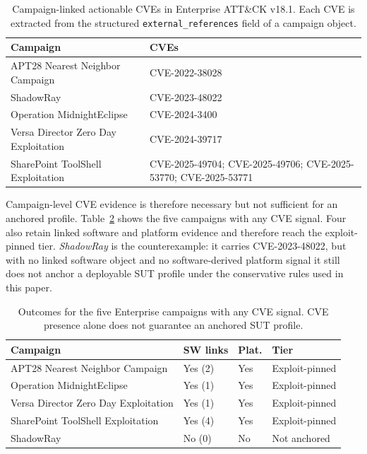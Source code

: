 \documentclass[sigconf]{acmart}
\begin{document}
\begin{table}[!htb]
\caption{Campaign-linked actionable CVEs in Enterprise ATT\&CK v18.1. Each CVE is extracted from the structured \texttt{external\_references} field of a campaign object.}\label{tab:campaign_linked_cves}
\centering\small
\begin{tabular}{>{\raggedright\arraybackslash}p{4.2cm} >{\raggedright\arraybackslash}p{3.0cm}}
\toprule
\textbf{Campaign} & \textbf{CVEs} \\
\midrule
APT28 Nearest Neighbor Campaign & CVE-2022-38028 \\
ShadowRay & CVE-2023-48022 \\
Operation MidnightEclipse & CVE-2024-3400 \\
Versa Director Zero Day Exploitation & CVE-2024-39717 \\
SharePoint ToolShell Exploitation & CVE-2025-49704; CVE-2025-49706; CVE-2025-53770; CVE-2025-53771 \\
\bottomrule
\end{tabular}
\end{table}

Campaign-level CVE evidence is therefore necessary but not sufficient for an anchored profile. Table~\ref{tab:cve_profile_outcomes} shows the five campaigns with any CVE signal. Four also retain linked software and platform evidence and therefore reach the exploit-pinned tier. \emph{ShadowRay} is the counterexample: it carries CVE-2023-48022, but with no linked software object and no software-derived platform signal it still does not anchor a deployable SUT profile under the conservative rules used in this paper.

\begin{table}[!htb]
\caption{Outcomes for the five Enterprise campaigns with any CVE signal. CVE presence alone does not guarantee an anchored SUT profile.}\label{tab:cve_profile_outcomes}
\centering\scriptsize
\begin{tabular}{@{}>{\raggedright\arraybackslash}p{2.55cm}>{\centering\arraybackslash}p{1.05cm}>{\centering\arraybackslash}p{0.95cm}>{\raggedright\arraybackslash}p{1.45cm}@{}}
\toprule
\textbf{Campaign} & \textbf{SW links} & \textbf{Plat.} & \textbf{Tier} \\
\midrule
APT28 Nearest Neighbor Campaign & Yes (2) & Yes & Exploit-pinned \\
Operation MidnightEclipse & Yes (1) & Yes & Exploit-pinned \\
Versa Director Zero Day Exploitation & Yes (1) & Yes & Exploit-pinned \\
SharePoint ToolShell Exploitation & Yes (4) & Yes & Exploit-pinned \\
ShadowRay & No (0) & No & Not anchored \\
\bottomrule
\end{tabular}
\end{table}
\end{document}
